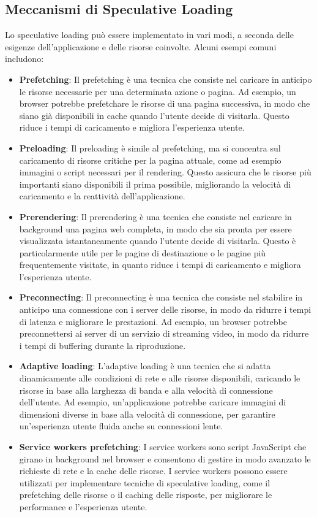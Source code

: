 \subsection{Meccanismi di Speculative Loading}
Lo speculative loading può essere implementato in vari modi, a seconda delle esigenze dell'applicazione e delle risorse coinvolte. Alcuni esempi comuni includono:
\begin{itemize}
    \item \textbf{Prefetching}: Il prefetching è una tecnica che consiste nel caricare in anticipo le risorse necessarie per una determinata azione o pagina. Ad esempio, un browser potrebbe prefetchare le risorse di una pagina successiva, in modo che siano già disponibili in cache quando l'utente decide di visitarla. Questo riduce i tempi di caricamento e migliora l'esperienza utente.
    \item \textbf{Preloading}: Il preloading è simile al prefetching, ma si concentra sul caricamento di risorse critiche per la pagina attuale, come ad esempio immagini o script necessari per il rendering. Questo assicura che le risorse più importanti siano disponibili il prima possibile, migliorando la velocità di caricamento e la reattività dell'applicazione.
    \item \textbf{Prerendering}: Il prerendering è una tecnica che consiste nel caricare in background una pagina web completa, in modo che sia pronta per essere visualizzata istantaneamente quando l'utente decide di visitarla. Questo è particolarmente utile per le pagine di destinazione o le pagine più frequentemente visitate, in quanto riduce i tempi di caricamento e migliora l'esperienza utente.
    \item \textbf{Preconnecting}: Il preconnecting è una tecnica che consiste nel stabilire in anticipo una connessione con i server delle risorse, in modo da ridurre i tempi di latenza e migliorare le prestazioni. Ad esempio, un browser potrebbe preconnettersi ai server di un servizio di streaming video, in modo da ridurre i tempi di buffering durante la riproduzione.
    \item \textbf{Adaptive loading}: L'adaptive loading è una tecnica che si adatta dinamicamente alle condizioni di rete e alle risorse disponibili, caricando le risorse in base alla larghezza di banda e alla velocità di connessione dell'utente. Ad esempio, un'applicazione potrebbe caricare immagini di dimensioni diverse in base alla velocità di connessione, per garantire un'esperienza utente fluida anche su connessioni lente.
    \item \textbf{Service workers prefetching}: I service workers sono script JavaScript che girano in background nel browser e consentono di gestire in modo avanzato le richieste di rete e la cache delle risorse. I service workers possono essere utilizzati per implementare tecniche di speculative loading, come il prefetching delle risorse o il caching delle risposte, per migliorare le performance e l'esperienza utente.
\end{itemize}

